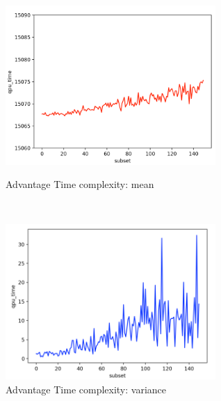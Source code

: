 \documentclass[oneside,a4paper]{article}
\begin{document}
\begin{figure}[htp]
\begin{minipage}[b]{7.5cm}
\centering
\includegraphics[width=8cm]{LaTeXTemplate/Images/AdvantageTimeComplexity.png}
\caption{Advantage Time complexity: mean}
\end{minipage}
\ \hspace{2mm} \hspace{2mm} \
\begin{minipage}[b]{9cm}
\centering
\includegraphics[width=8cm]{LaTeXTemplate/Images/AdvantageTimeVariance.png}
\caption{Advantage Time complexity: variance}
\end{minipage}
\end{figure}
\end{document}
